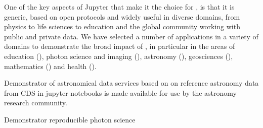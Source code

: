 \begin{workpackage}
\begin{wpdescription}
  One of the key aspects of Jupyter that make it the choice for
  \TheProject, is that it is generic, based on open protocols and
  widely useful in diverse domains, from physics to life sciences to
  education and the global community working with public and private
  data. We have selected a number of applications in a variety of domains
  to demonstrate the broad impact of \TheProject, in particular in the
  areas of education (), photon science and
  imaging (), astronomy
  (), geosciences (),
  mathematics () and health ().

\end{wpdescription}

\begin{tasklist}
% 







\end{tasklist}



\begin{wpdelivs}
\begin{wpdeliv}[due=42,miles=community,id=application-astro,dissem=PU,nature=DEM,lead=CDS]
    {Demonstrator of astronomical data services based on on reference astronomy data from CDS in jupyter notebooks is made available for use by the astronomy research community.}
\end{wpdeliv}
\begin{wpdeliv}[due=45,miles=final,id=xfel-workflows,dissem=PU,nature=DEM,lead=XFEL]
  {Demonstrator reproducible photon science}
\end{wpdeliv}


\end{wpdelivs}
\end{workpackage}
